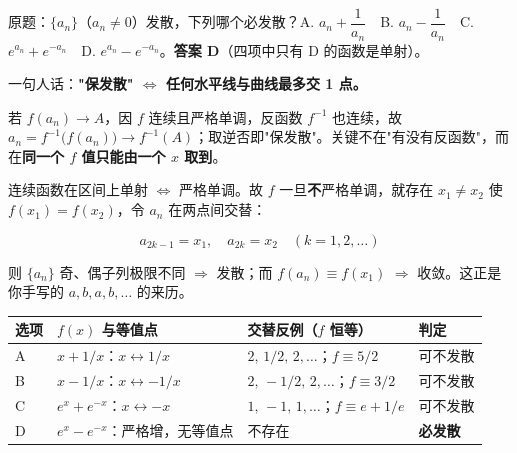 \documentclass[11pt,a4paper]{ctexart}
\begin{document}

原题：$\{a_n\}$（$a_n\ne0$）发散，下列哪个必发散？A. $a_n+\dfrac1{a_n}$　B. $a_n-\dfrac1{a_n}$　C. $e^{a_n}+e^{-a_n}$　D. $e^{a_n}-e^{-a_n}$。\textbf{答案 D}（四项中只有 D 的函数是单射）。


一句人话：\textbf{"保发散" $\iff$ 任何水平线与曲线最多交 1 点。}


若 $f(a_n)\to A$，因 $f$ 连续且严格单调，反函数 $f^{-1}$ 也连续，故 $a_n=f^{-1}\!\big(f(a_n)\big)\to f^{-1}(A)$；取逆否即"保发散"。关键不在"有没有反函数"，而在\textbf{同一个 $f$ 值只能由一个 $x$ 取到}。


连续函数在区间上单射 $\iff$ 严格单调。故 $f$ 一旦\textbf{不}严格单调，就存在 $x_1\ne x_2$ 使 $f(x_1)=f(x_2)$，令 $a_n$ 在两点间交替：

\[
a_{2k-1}=x_1,\quad a_{2k}=x_2\quad(k=1,2,\dots)
\]

则 $\{a_n\}$ 奇、偶子列极限不同 $\Rightarrow$ 发散；而 $f(a_n)\equiv f(x_1)$ $\Rightarrow$ 收敛。这正是你手写的 $a,b,a,b,\dots$ 的来历。


\begin{center}\small
\begin{tabularx}{\linewidth}{@{}>{\raggedright\arraybackslash}X>{\raggedright\arraybackslash}X>{\raggedright\arraybackslash}X>{\raggedright\arraybackslash}X@{}}
\toprule
选项 & $f(x)$ 与等值点 & 交替反例（$f$ 恒等） & 判定 \\
\midrule
A & $x+1/x$：$x\leftrightarrow1/x$ & $2,\,1/2,\,2,\dots$；$f\equiv5/2$ & 可不发散 \\
B & $x-1/x$：$x\leftrightarrow-1/x$ & $2,\,-1/2,\,2,\dots$；$f\equiv3/2$ & 可不发散 \\
C & $e^x+e^{-x}$：$x\leftrightarrow-x$ & $1,\,-1,\,1,\dots$；$f\equiv e+1/e$ & 可不发散 \\
D & $e^x-e^{-x}$：严格增，无等值点 & 不存在 & \textbf{必发散} \\
\bottomrule
\end{tabularx}
\end{center}
\end{document}

